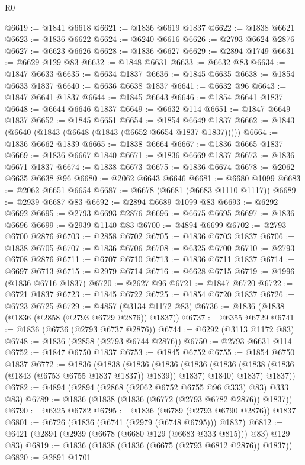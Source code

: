 \begin{lexlean}{R0}
\begin{coremodule}
@6619 := @1841 @6618
@6621 := @1836 @6619 @1837
@6622 := @1838 @6621
@6623 := @1836 @6622
@6624 := @6240 @6616
@6626 := @2793 @6624 @2876
@6627 := @6623 @6626
@6628 := @1836 @6627
@6629 := @2894 @1749
@6631 := @6629 @129 @83
@6632 := @1848 @6631
@6633 := @6632 @83
@6634 := @1847 @6633
@6635 := @6634 @1837
@6636 := @1845 @6635
@6638 := @1854 @6633 @1837
@6640 := @6636 @6638 @1837
@6641 := @6632 @96
@6643 := @1847 @6641 @1837
@6644 := @1845 @6643
@6646 := @1854 @6641 @1837
@6648 := @6644 @6646 @1837
@6649 := @6632 @114
@6651 := @1847 @6649 @1837
@6652 := @1845 @6651
@6654 := @1854 @6649 @1837
@6662 := @1843 (@6640 (@1843 (@6648 (@1843 (@6652 @6654 @1837 @1837)))))
@6664 := @1836 @6662 @1839
@6665 := @1838 @6664
@6667 := @1836 @6665 @1837
@6669 := @1836 @6667 @1840
@6671 := @1836 @6669 @1837
@6673 := @1836 @6671 @1837
@6674 := @1838 @6673
@6675 := @1836 @6674
@6678 := @2062 @6635 @6638 @96
@6680 := @2062 @6643 @6646
@6681 := @6680 @1099
@6683 := @2062 @6651 @6654
@6687 := @6678 (@6681 (@6683 @1110 @1117))
@6689 := @2939 @6687 @83
@6692 := @2894 @6689 @1099 @83
@6693 := @6292 @6692
@6695 := @2793 @6693 @2876
@6696 := @6675 @6695
@6697 := @1836 @6696
@6699 := @2939 @1140 @83
@6700 := @4894 @6699
@6702 := @2793 @6700 @2876
@6703 := @2858 @6702
@6705 := @1836 @6703 @1837
@6706 := @1838 @6705
@6707 := @1836 @6706
@6708 := @6325 @6700
@6710 := @2793 @6708 @2876
@6711 := @6707 @6710
@6713 := @1836 @6711 @1837
@6714 := @6697 @6713
@6715 := @2979 @6714
@6716 := @6628 @6715
@6719 := @1996 (@1836 @6716 @1837)
@6720 := @2627 @96
@6721 := @1847 @6720
@6722 := @6721 @1837
@6723 := @1845 @6722
@6725 := @1854 @6720 @1837
@6726 := @6723 @6725
@6729 := @4857 (@3134 @1172 @83)
@6736 := @1836 (@1838 (@1836 (@2858 (@2793 @6729 @2876)) @1837))
@6737 := @6355 @6729
@6741 := @1836 (@6736 (@2793 @6737 @2876))
@6744 := @6292 (@3113 @1172 @83)
@6748 := @1836 (@2858 (@2793 @6744 @2876))
@6750 := @2793 @6631 @114
@6752 := @1847 @6750 @1837
@6753 := @1845 @6752
@6755 := @1854 @6750 @1837
@6772 := @1836
    (@1838
      (@1836
        (@1836
          (@1836 (@1836 (@1838 (@1836 (@1843 (@6753 @6755 @1837 @1837)) @1839)) @1837) @1840)
          @1837)
        @1837))
@6782 := @4894 (@2894 (@2868 (@2062 @6752 @6755 @96 @333) @83) @333 @83)
@6789 := @1836 (@1838 (@1836 (@6772 (@2793 @6782 @2876)) @1837))
@6790 := @6325 @6782
@6795 := @1836 (@6789 (@2793 @6790 @2876)) @1837
@6801 := @6726 (@1836 (@6741 (@2979 (@6748 @6795))) @1837)
@6812 := @6421 (@2894 (@2939 (@6678 (@6680 @129 (@6683 @333 @815))) @83) @129 @83)
@6819 := @1836 (@1838 (@1836 (@6675 (@2793 @6812 @2876)) @1837))
@6820 := @2891 @1701

\end{coremodule}
\end{lexlean}
